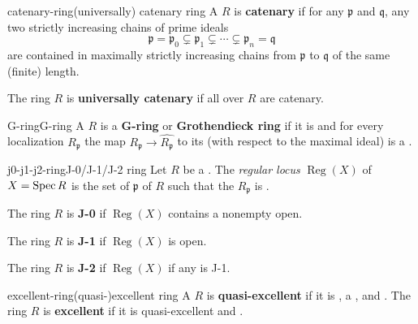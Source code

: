 \begin{topic}{catenary-ring}{(universally) catenary ring}
    A  $R$ is \textbf{catenary} if for any  $\mathfrak{p}$ and $\mathfrak{q}$, any two strictly increasing chains of prime ideals
    \[ \mathfrak{p} = \mathfrak{p}_0 \subsetneq \mathfrak{p}_1 \subsetneq \cdots \subsetneq \mathfrak{p}_n = \mathfrak{q} \]
    are contained in maximally strictly increasing chains from $\mathfrak{p}$ to $\mathfrak{q}$ of the same (finite) length.
    
    The ring $R$ is \textbf{universally catenary} if all  over $R$ are catenary.
\end{topic}

\begin{topic}{G-ring}{G-ring}
    A  $R$ is a \textbf{G-ring} or \textbf{Grothendieck ring} if it is  and for every localization $R_{\mathfrak{p}}$ the map $R_{\mathfrak{p}} \to \widehat{R_{\mathfrak{p}}}$ to its  (with respect to the maximal ideal) is a .
\end{topic}

\begin{topic}{j0-j1-j2-ring}{J-0/J-1/J-2 ring}
    Let $R$ be a  . The \textit{regular locus} $\operatorname{Reg}(X)$ of $X = \operatorname{Spec} R$ is the set of  $\mathfrak{p}$ of $R$ such that the  $R_\mathfrak{p}$ is .
    
    The ring $R$ is \textbf{J-0} if $\operatorname{Reg}(X)$ contains a nonempty open.
    
    The ring $R$ is \textbf{J-1} if $\operatorname{Reg}(X)$ is open.
    
    The ring $R$ is \textbf{J-2} if $\operatorname{Reg}(X)$ if any  is J-1.
\end{topic}

\begin{topic}{excellent-ring}{(quasi-)excellent ring}
    A  $R$ is \textbf{quasi-excellent} if it is , a , and .
    The ring $R$ is \textbf{excellent} if it is quasi-excellent and .
\end{topic}

